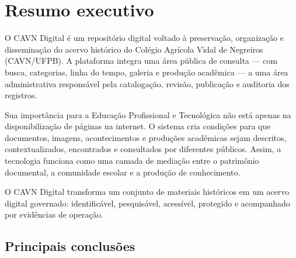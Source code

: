 \documentclass[11pt,a4paper]{article}
\begin{document}
\hypersetup{pageanchor=true}
\tableofcontents
\clearpage
{}

\section{Resumo executivo}

O CAVN Digital é um repositório digital voltado à preservação, organização e disseminação do acervo histórico do Colégio Agrícola Vidal de Negreiros (CAVN/UFPB). A plataforma integra uma área pública de consulta — com busca, categorias, linha do tempo, galeria e produção acadêmica — a uma área administrativa responsável pela catalogação, revisão, publicação e auditoria dos registros.

Sua importância para a Educação Profissional e Tecnológica não está apenas na disponibilização de páginas na internet. O sistema cria condições para que documentos, imagens, acontecimentos e produções acadêmicas sejam descritos, contextualizados, encontrados e consultados por diferentes públicos. Assim, a tecnologia funciona como uma camada de mediação entre o patrimônio documental, a comunidade escolar e a produção de conhecimento.

\begin{conceptbox}[title=Síntese em uma frase]
O CAVN Digital transforma um conjunto de materiais históricos em um acervo digital governado: identificável, pesquisável, acessível, protegido e acompanhado por evidências de operação.
\end{conceptbox}

\subsection*{Principais conclusões}
\end{document}
